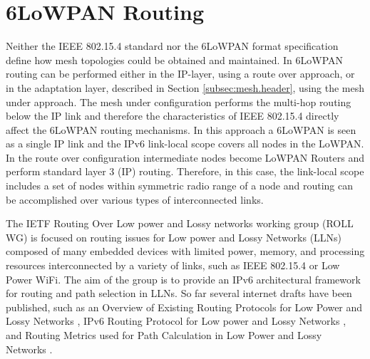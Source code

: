 \chapter{6LoWPAN Routing}\label{ch:routing}
Neither the IEEE 802.15.4 \cite{ieee802.15.4} standard nor the 6LoWPAN format specification \cite{rfc4944} define how mesh topologies could be obtained and maintained. In 6LoWPAN routing can be performed either in the IP-layer, using a route over approach, or in the adaptation layer, described in Section \ref{subsec:mesh.header}, using the mesh under approach. The mesh under configuration performs the multi-hop routing below the IP link and therefore the characteristics of IEEE 802.15.4 directly affect the 6LoWPAN routing mechanisms. In this approach a 6LoWPAN is seen as a single IP link and the IPv6 link-local scope covers all nodes in the LoWPAN. In the route over configuration intermediate nodes become LoWPAN Routers and perform standard layer 3 (IP) routing. Therefore, in this case, the link-local scope includes a set of nodes within symmetric radio range of a node and routing can be accomplished over various types of interconnected links.

The IETF Routing Over Low power and Lossy networks working group  (ROLL WG) is focused on routing issues for Low power and Lossy Networks (LLNs)  composed of many embedded devices with limited power, memory, and processing resources interconnected by a variety of links, such as IEEE 802.15.4 or Low Power WiFi. The aim of the group is to provide an IPv6 architectural framework for routing and path selection in LLNs. So far several internet drafts have been published, such as an Overview of Existing Routing Protocols for Low Power and Lossy Networks \cite{draft-protocols-07},  IPv6 Routing Protocol for Low power and Lossy Networks \cite{draft-rpl-04}, and Routing Metrics used for Path Calculation in Low Power and Lossy Networks \cite{draft-routing-metrics-04}. 


